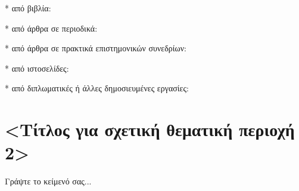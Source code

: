 * από βιβλία: \cite{[RSV02]}

* από άρθρα σε περιοδικά: \cite{[ACC+03],[DRS09],[GBE+00]}

* από άρθρα σε πρακτικά επιστημονικών συνεδρίων: \cite{[JMS+08],[MHP05],[PS11]}

* από ιστοσελίδες: \cite{[Ora11]}

* από διπλωματικές ή άλλες δημοσιευμένες εργασίες: \cite{[Pap15]}


\section{<Τίτλος για σχετική θεματική περιοχή 2>}

Γράψτε το κείμενό σας...

